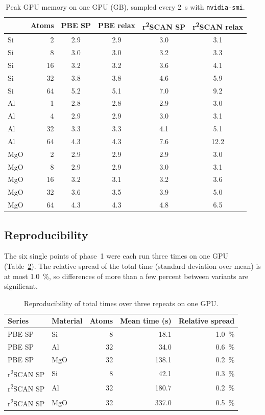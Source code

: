\documentclass[11pt,letterpaper]{article}
\begin{document}
\begin{table}[htbp]
\centering
\caption{Peak GPU memory on one GPU (GB), sampled every \SI{2}{s} with \texttt{nvidia-smi}.}
\label{tab:mem}
\small
\begin{tabular}{@{}lr cccc@{}}
\toprule
 & Atoms & PBE SP & PBE relax & r\textsuperscript{2}SCAN SP & r\textsuperscript{2}SCAN relax \\
\midrule
Si & 2 & 2.9 & 2.9 & 3.0 & 3.1 \\
Si & 8 & 3.0 & 3.0 & 3.2 & 3.3 \\
Si & 16 & 3.2 & 3.2 & 3.6 & 4.1 \\
Si & 32 & 3.8 & 3.8 & 4.6 & 5.9 \\
Si & 64 & 5.2 & 5.1 & 7.0 & 9.2 \\
\addlinespace
Al & 1 & 2.8 & 2.8 & 2.9 & 3.0 \\
Al & 4 & 2.9 & 2.9 & 3.0 & 3.1 \\
Al & 32 & 3.3 & 3.3 & 4.1 & 5.1 \\
Al & 64 & 4.3 & 4.3 & 7.6 & 12.2 \\
\addlinespace
MgO & 2 & 2.9 & 2.9 & 2.9 & 3.0 \\
MgO & 8 & 2.9 & 2.9 & 3.0 & 3.1 \\
MgO & 16 & 3.2 & 3.1 & 3.2 & 3.6 \\
MgO & 32 & 3.6 & 3.5 & 3.9 & 5.0 \\
MgO & 64 & 4.3 & 4.3 & 4.8 & 6.5 \\
\bottomrule
\end{tabular}
\end{table}

\subsection{Reproducibility}
\label{sec:res-repro}
The six single points of phase~1 were each run three times on one GPU
(Table~\ref{tab:repro}). The relative spread of the total time (standard deviation over mean)
is at most \SI{1.0}{\percent}, so differences of more than a few percent between variants are
significant.

\begin{table}[htbp]
\centering
\caption{Reproducibility of total times over three repeats on one GPU.}
\label{tab:repro}
\small
\begin{tabular}{@{}llrrr@{}}
\toprule
Series & Material & Atoms & Mean time (s) & Relative spread \\
\midrule
PBE SP & Si & 8 & 18.1 & \SI{1.0}{\percent} \\
PBE SP & Al & 32 & 34.0 & \SI{0.6}{\percent} \\
PBE SP & MgO & 32 & 138.1 & \SI{0.2}{\percent} \\
r\textsuperscript{2}SCAN SP & Si & 8 & 42.1 & \SI{0.3}{\percent} \\
r\textsuperscript{2}SCAN SP & Al & 32 & 180.7 & \SI{0.2}{\percent} \\
r\textsuperscript{2}SCAN SP & MgO & 32 & 337.0 & \SI{0.5}{\percent} \\
\bottomrule
\end{tabular}
\end{table}
\end{document}
